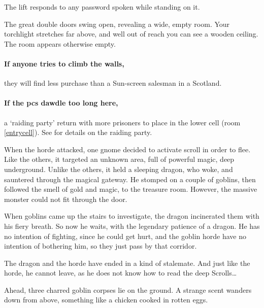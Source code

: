 The lift responds to any password spoken while standing on it.

\begin{boxtext}
  The great double doors swing open, revealing a wide, empty room.
  Your torchlight stretches far above, and well out of reach you can see a wooden ceiling.
  The room appears otherwise empty.
\end{boxtext}

\paragraph{If anyone tries to climb the walls,}
they will find less purchase than a Sun-screen salesman in a Scotland.

\paragraph{If the \glspl{pc} dawdle too long here,}
a `raiding party' return with more prisoners to place in the lower cell (room \ref{entrycell}).
See  for details on the raiding party.


\begin{exampletext}
  When the horde attacked, one gnome decided to activate  scroll in order to flee.
  Like the others, it targeted an unknown area, full of powerful magic, deep underground.
  Unlike the others, it held a sleeping dragon, who woke, and sauntered through the magical gateway.
  He stomped on a couple of goblins, then followed the smell of gold and magic, to the treasure room.
  However, the massive monster could not fit through the door.

  When goblins came up the stairs to investigate, the dragon incinerated them with his fiery breath.
  So now he waits, with the legendary patience of a dragon.
  He has no intention of fighting, since he could get hurt, and the goblin horde have no intention of bothering him, so they just pass by that corridor.

  The dragon and the horde have ended in a kind of stalemate.
  And just like the horde, he cannot leave, as he does not know how to read the \Gls{deep} Scrolls\ldots
\end{exampletext}

\begin{boxtext}
  Ahead, three charred goblin corpses lie on the ground.
  A strange scent wanders down from above, something like a chicken cooked in rotten eggs.
\end{boxtext}

